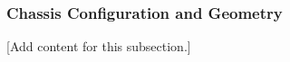 
\subsubsection{Chassis Configuration and Geometry}
\label{subsubsec:design_2_1_1_chassis_configuration_geometry}

[Add content for this subsection.]
